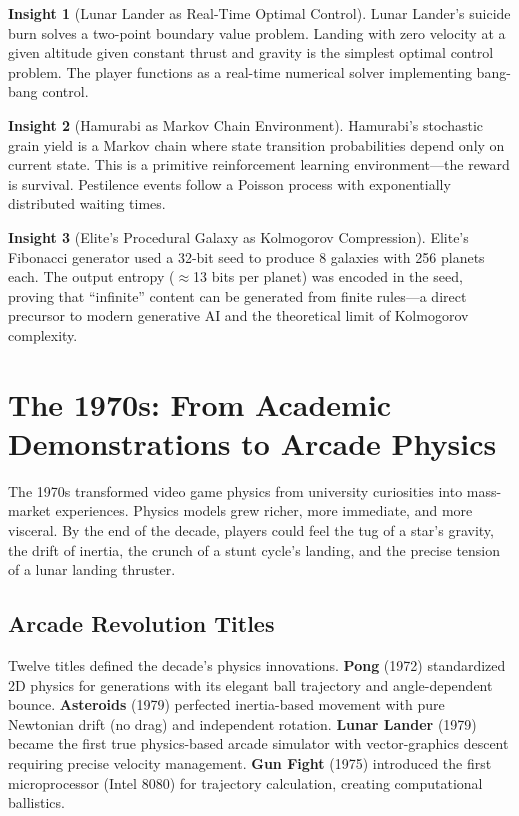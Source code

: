 \documentclass[11pt,a4paper]{article}
\theoremstyle{definition}
\newtheorem{insight}{Insight}[section]
\begin{document}
\begin{insight}[Lunar Lander as Real-Time Optimal Control]
Lunar Lander's suicide burn solves a two-point boundary value problem. Landing with zero velocity at a given altitude given constant thrust and gravity is the simplest optimal control problem. The player functions as a real-time numerical solver implementing bang-bang control.
\end{insight}

\begin{insight}[Hamurabi as Markov Chain Environment]
Hamurabi's stochastic grain yield is a Markov chain where state transition probabilities depend only on current state. This is a primitive reinforcement learning environment---the reward is survival. Pestilence events follow a Poisson process with exponentially distributed waiting times.
\end{insight}

\begin{insight}[Elite's Procedural Galaxy as Kolmogorov Compression]
Elite's Fibonacci generator used a 32-bit seed to produce 8 galaxies with 256 planets each. The output entropy ($\approx$13 bits per planet) was encoded in the seed, proving that ``infinite'' content can be generated from finite rules---a direct precursor to modern generative AI and the theoretical limit of Kolmogorov complexity.
\end{insight}

\section{The 1970s: From Academic Demonstrations to Arcade Physics}\label{sec:1970s}

The 1970s transformed video game physics from university curiosities into mass-market experiences. Physics models grew richer, more immediate, and more visceral. By the end of the decade, players could feel the tug of a star's gravity, the drift of inertia, the crunch of a stunt cycle's landing, and the precise tension of a lunar landing thruster.

\subsection{Arcade Revolution Titles}

Twelve titles defined the decade's physics innovations. \textbf{Pong} (1972) standardized 2D physics for generations with its elegant ball trajectory and angle-dependent bounce. \textbf{Asteroids} (1979) perfected inertia-based movement with pure Newtonian drift (no drag) and independent rotation. \textbf{Lunar Lander} (1979) became the first true physics-based arcade simulator with vector-graphics descent requiring precise velocity management. \textbf{Gun Fight} (1975) introduced the first microprocessor (Intel 8080) for trajectory calculation, creating computational ballistics.
\end{document}
